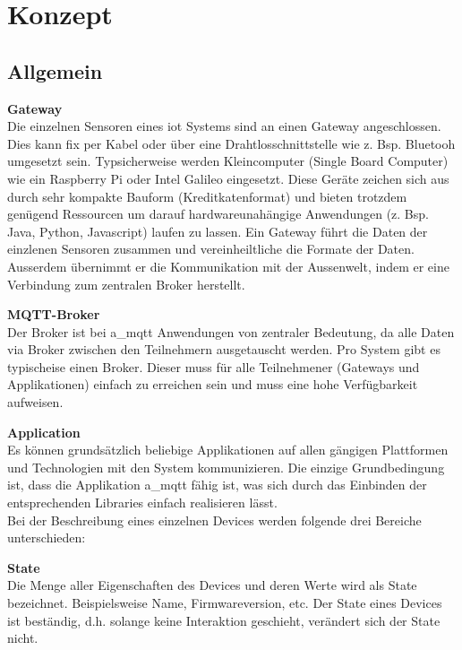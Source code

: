 \chapter{Konzept}
\label{chap:konzept}


\section{Allgemein}

\textbf{Gateway} \\
Die einzelnen Sensoren eines \gls{iot} Systems sind an einen Gateway angeschlossen. Dies kann fix per Kabel oder über eine Drahtlosschnittstelle wie z. Bsp. Bluetooh umgesetzt sein. Typsicherweise werden Kleincomputer (Single Board Computer) wie ein Raspberry Pi oder Intel Galileo eingesetzt. Diese Geräte zeichen sich aus durch sehr kompakte Bauform (Kreditkatenformat) und bieten trotzdem genügend Ressourcen um darauf hardwareunahängige Anwendungen (z. Bsp. Java, Python, Javascript) laufen zu lassen. 
Ein Gateway führt die Daten der einzlenen Sensoren zusammen und vereinheiltliche die Formate der Daten. Ausserdem übernimmt er die Kommunikation mit der Aussenwelt, indem er eine Verbindung zum zentralen Broker herstellt.

\textbf{MQTT-Broker} \\
Der Broker ist bei \acrshort{a_mqtt} Anwendungen von zentraler Bedeutung, da alle Daten via Broker zwischen den Teilnehmern ausgetauscht werden. Pro System gibt es typischeise einen Broker. Dieser muss für alle Teilnehmener (Gateways und Applikationen) einfach zu erreichen sein und muss eine hohe Verfügbarkeit aufweisen.

\textbf{Application} \\
Es können grundsätzlich beliebige Applikationen auf allen gängigen Plattformen und Technologien mit den System kommunizieren. Die einzige Grundbedingung ist, dass die Applikation \acrshort{a_mqtt} fähig ist, was sich durch das Einbinden der entsprechenden Libraries einfach realisieren lässt.
\\


Bei der Beschreibung eines einzelnen Devices werden folgende drei Bereiche unterschieden:

\textbf{State} \\
Die Menge aller Eigenschaften des Devices und deren Werte wird als State bezeichnet. Beispielsweise Name, Firmwareversion, etc. Der State eines Devices ist beständig, d.h. solange keine Interaktion geschieht, verändert sich der State nicht.


